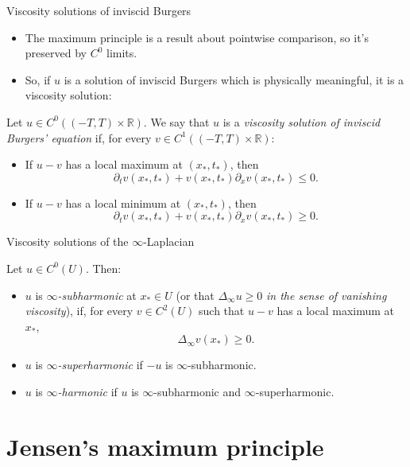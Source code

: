 \documentclass[10pt]{beamer}
\newcommand{\RR}{\mathbb{R}}
\begin{document}
\begin{frame}{Viscosity solutions of inviscid Burgers}
\begin{itemize}
\item The maximum principle is a result about pointwise comparison, so it's preserved by $C^0$ limits. \pause
\item So, if $u$ is a solution of inviscid Burgers which is physically meaningful, it is a viscosity solution: \pause
\end{itemize}

\begin{definition}
Let $u \in C^0((-T, T) \times \RR)$. We say that $u$ is a \emph{viscosity solution of inviscid Burgers' equation} if, for every $v \in C^1((-T, T) \times \RR)$: \pause
\begin{itemize}
\item If $u - v$ has a local maximum at $(x_*, t_*)$, then
$$\partial_t v(x_*, t_*) + v(x_*, t_*) \partial_x v(x_*, t_*) \leq 0.$$
\item If $u - v$ has a local minimum at $(x_*, t_*)$, then 
$$\partial_t v(x_*, t_*) + v(x_*, t_*) \partial_x v(x_*, t_*) \geq 0.$$
\end{itemize}
\end{definition}
\end{frame}

\begin{frame}{Viscosity solutions of the $\infty$-Laplacian} 
\begin{definition}
Let $u \in C^0(U)$. Then:
\begin{itemize}
\item $u$ is \emph{$\infty$-subharmonic} at $x_* \in U$ (or that $\Delta_\infty u \geq 0$ \emph{in the sense of vanishing viscosity}), if, for every $v \in C^2(U)$ such that $u - v$ has a local maximum at $x_*$,
$$\Delta_\infty v(x_*) \geq 0.$$
\item $u$ is \emph{$\infty$-superharmonic} if $-u$ is $\infty$-subharmonic.
\item $u$ is \emph{$\infty$-harmonic} if $u$ is $\infty$-subharmonic and $\infty$-superharmonic.
\end{itemize}
\end{definition}
\end{frame}

\section{Jensen's maximum principle}
\end{document}
